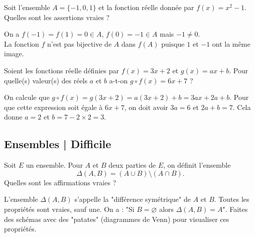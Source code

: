 \begin{question}
Soit l'ensemble $A = \{ -1 , 0 , 1 \}$ et la fonction réelle donnée par $f(x) = x^2-1$. Quelles sont les assertions vraies ?
\begin{answers} 
\end{answers}
\begin{explanations} 
On a $f(-1) = f(1) = 0 \in A$, $f(0) = -1 \in A$ mais $-1 \neq 0$.\\
La fonction $f$ n'est pas bijective de $A$ dans $f(A)$ puisque $1$ et $-1$ ont la même image.
\end{explanations}
\end{question}


\begin{question}
Soient les fonctions réelle définies par $f(x) = 3x+2$ et $g(x) = ax + b$. Pour quelle(s) valeur(s) des réels $a$ et $b$ a-t-on $g \circ f (x) = 6x + 7$ ?
\begin{answers} 
\end{answers}
\begin{explanations} 
On calcule que $g \circ f (x) = g(3x+2) = a(3x+2) + b = 3a x + 2a + b$. Pour que cette expression soit égale à $6x+7$, on doit avoir $3a = 6$ et $2a+b=7$. Cela donne $a=2$ et $b=7- 2 \times 2 = 3$.
\end{explanations}
\end{question}


\subsection{Ensembles | Difficile}

\begin{question}
Soit $E$ un ensemble. Pour $A$ et $B$ deux parties de $E$, on définit l'ensemble
$$\Delta(A,B) = (A \cup B) \setminus (A \cap B).$$
Quelles sont les affirmations vraies ?
\begin{answers}
\end{answers}
\begin{explanations} 
L'ensemble $\Delta(A,B)$ s'appelle la "différence symétrique" de $A$ et $B$.
Toutes les propriétés sont vraies, sauf une. On a : "Si $B = \varnothing$ alors $\Delta(A,B) = A$".
Faites des schémas avec des "patates" (diagrammes de Venn) pour visualiser ces propriétés.
\end{explanations}
\end{question}


